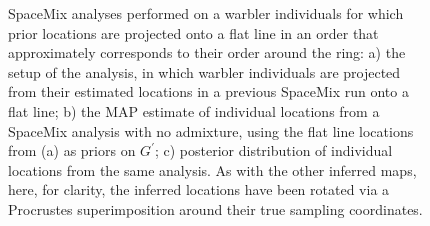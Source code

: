 \documentclass[12pt]{article}
\begin{document}
\begin{figure}
	\caption{SpaceMix analyses performed on a warbler individuals for which prior locations are projected onto a flat line in an order that approximately corresponds to their order around the ring: a) the setup of the analysis, in which warbler individuals are projected from their estimated locations in a previous SpaceMix run onto a flat line; b) the MAP estimate of individual locations from a SpaceMix analysis with no admixture, using the flat line locations from (a) as priors on $G^{\prime}$; c) posterior distribution of individual locations from the same analysis.  As with the other inferred maps, here, for clarity, the inferred locations have been rotated via a Procrustes superimposition around their true sampling coordinates.}
	\label{sfig:warb_inds_on_a_line}
\end{figure}
\end{document}
